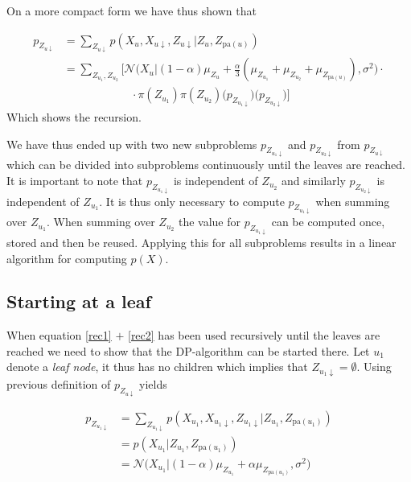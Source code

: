 On a more compact form we have thus shown that

\begin{align}
  p_{Z_{u \downarrow}} & = \sum_{Z_{u \downarrow}} p(X_u, X_{u \downarrow}, Z_{u \downarrow}|Z_u, Z_{\text{pa}(u)}) \\
  & = \sum_{Z_{u_1}, Z_{u_2}} \bigg[ \mathcal{N}\Big(X_u|(1-\alpha)\mu_{Z_u} +\frac{\alpha}{3}(\mu_{Z_{u_1}}+\mu_{Z_{u_2}}+\mu_{Z_{\text{pa}(u)}}), \sigma^2 \Big) \cdot \label{rec1}\\
  & \qquad\qquad\qquad  \cdot \pi(Z_{u_1}) \pi(Z_{u_2}) \Big(p_{Z_{u_1\downarrow}}\Big) \Big( p_{Z_{u_2\downarrow}}\Big)\bigg] \label{rec2}
\end{align}
Which shows the recursion.


We have thus ended up with two new subproblems $p_{Z_{u_1\downarrow}}$ and $p_{Z_{u_2\downarrow}}$ from $p_{Z_{u \downarrow}}$ which can be divided into subproblems continuously until the leaves are reached.
\\

It is important to note that $p_{Z_{u_1\downarrow}}$ is independent of $Z_{u_2}$ and similarly $p_{Z_{u_2\downarrow}}$ is independent of $Z_{u_1}$. It is thus only necessary to compute $p_{Z_{u_1\downarrow}}$ when summing over $Z_{u_1}$. When summing over $Z_{u_2}$ the value for $p_{Z_{u_1\downarrow}}$ can be computed once, stored and then be reused. Applying this for all subproblems results in a linear algorithm for computing $p(X)$.


\subsection*{Starting at a leaf}
When equation \eqref{rec1} $+$ \eqref{rec2} has been used recursively until the leaves are reached we need to show that the DP-algorithm can be started there. Let $u_1$ denote a \textit{leaf node}, it thus has no children which implies that $Z_{u_1 \downarrow} = \emptyset$. Using previous definition of $p_{Z_{u \downarrow}}$ yields

 \begin{align}
   p_{Z_{u_1 \downarrow}} & = \sum_{Z_{u_1 \downarrow}} p(X_{u_1}, X_{u_1 \downarrow}, Z_{u_1 \downarrow}|Z_{u_1}, Z_{\text{pa}(u_1)}) \nonumber\\
   & = p(X_{u_1}|Z_{u_1}, Z_{\text{pa}(u_1)}) \nonumber\\
   & = \mathcal{N}\Big(X_{u_1} | (1-\alpha)\mu_{Z_{u_1}} + \alpha \mu_{Z_{\text{pa}(u_1)}}, \sigma^2 \Big)
 \end{align}
